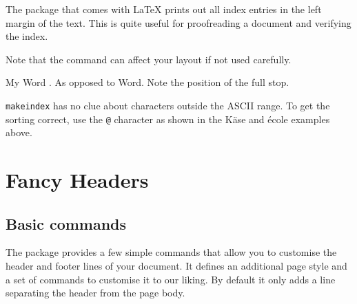 The  package that comes with \LaTeX{} prints out all
index entries in the left margin of the text. This is quite useful for
proofreading a document and verifying the index.

Note that the  command can affect your layout if not used carefully.

\begin{chktexignore}
  \begin{example}
My Word . As opposed
to Word. Note the
position of the full stop.
\end{example}
\end{chktexignore}

\texttt{makeindex} has no clue about characters outside the ASCII range. To
get the sorting correct, use the \verb|@| character as shown in the K\"ase
and \'ecole examples above.

\section{Fancy Headers}\label{sec:fancy}

\subsection{Basic commands}

The  package provides a few simple commands that allow you to
customise the header and footer lines of your document. It defines an
additional page style  and a set of commands to customise it to our liking. By
default it only adds a line separating the header from the page body.

